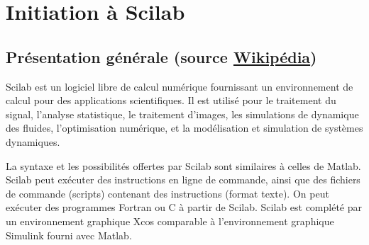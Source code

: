 \chapter{Initiation à Scilab\label{annexe-scilab}}
\section[Présentation générale]
        {Présentation générale 
        (source \href{https://fr.wikipedia.org/wiki/Scilab}{Wikipédia})}
Scilab est un logiciel libre de calcul numérique fournissant un environnement de
calcul pour des applications scientifiques. Il est utilisé pour le traitement 
du signal, l'analyse statistique, le traitement d'images, les simulations de 
dynamique des fluides, l'optimisation numérique, et la modélisation et 
simulation de systèmes dynamiques.

La syntaxe et les possibilités offertes par Scilab sont similaires à celles 
de Matlab. Scilab peut exécuter des instructions en ligne de commande, ainsi que
des fichiers de commande (scripts) contenant des instructions (format texte). 
On peut exécuter des programmes Fortran ou C à partir de Scilab.
Scilab est complété par un environnement graphique Xcos comparable 
à l'environnement graphique Simulink fourni avec Matlab. 
